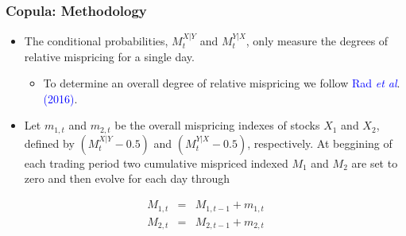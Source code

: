\documentclass[pdf,9pt,xcolor=dvipsnames,hide notes]{beamer}
\begin{document}
\begin{frame}[label=frame4f2]
	\frametitle{Copula: Methodology}
	
	
	\begin{itemize}
		\item The conditional probabilities, $M_{t}^{X\left\vert Y\right. }$ and $%
		M_{t}^{Y\left\vert X\right. }$, only measure the degrees of relative
		mispricing for a single day. 
		\begin{itemize}
			\item To determine an overall degree of relative
			mispricing we follow \textcolor{blue}{Rad \emph{et al}}. \textcolor{blue}{(2016)}.
		\end{itemize} 
		
		\vspace{0.3cm}
		
		\pause
		
		\item Let $m_{1,t}$ and $m_{2,t}$ be the
		overall mispricing indexes of stocks $X_{1}$ and $X_{2}$, defined by $\left(
		M_{t}^{X\left\vert Y\right. }-0.5\right) $ and $\left( M_{t}^{Y\left\vert
			X\right. }-0.5\right) $, respectively. At beggining of each
		trading period two cumulative mispriced indexed $M_{1}$ and $M_{2}$ are set
		to zero and then evolve for each day through%
	\end{itemize}
	
	\begin{eqnarray*}
		M_{1,t} &=&M_{1,t-1}+m_{1,t} \\
		M_{2,t} &=&M_{2,t-1}+m_{2,t}
	\end{eqnarray*}

\end{frame}
\end{document}
